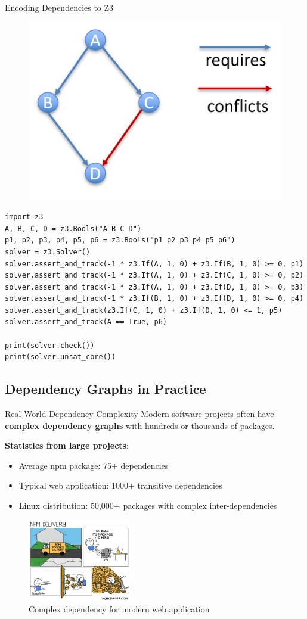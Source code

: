 \documentclass{beamer}
\begin{document}
\begin{frame}[fragile,t]{Encoding Dependencies to Z3}
\begin{figure}
    \includegraphics[width=.3\textwidth]{images/dependency-graph.png}
\end{figure}

\scriptsize
\begin{verbatim}
import z3
A, B, C, D = z3.Bools("A B C D")
p1, p2, p3, p4, p5, p6 = z3.Bools("p1 p2 p3 p4 p5 p6")
solver = z3.Solver()
solver.assert_and_track(-1 * z3.If(A, 1, 0) + z3.If(B, 1, 0) >= 0, p1)
solver.assert_and_track(-1 * z3.If(A, 1, 0) + z3.If(C, 1, 0) >= 0, p2)
solver.assert_and_track(-1 * z3.If(A, 1, 0) + z3.If(D, 1, 0) >= 0, p3)
solver.assert_and_track(-1 * z3.If(B, 1, 0) + z3.If(D, 1, 0) >= 0, p4)
solver.assert_and_track(z3.If(C, 1, 0) + z3.If(D, 1, 0) <= 1, p5)
solver.assert_and_track(A == True, p6)

print(solver.check())
print(solver.unsat_core())

\end{verbatim}
\end{frame}


\subsection{Dependency Graphs in Practice}

\begin{frame}[t]{Real-World Dependency Complexity}
Modern software projects often have \textbf{complex dependency graphs} with hundreds or thousands of packages.

\bigskip

\textbf{Statistics from large projects}:
\begin{itemize}
\item Average npm package: 75+ dependencies
\item Typical web application: 1000+ transitive dependencies
\item Linux distribution: 50,000+ packages with complex inter-dependencies
\end{itemize}

\bigskip

\begin{figure}
\centering
\includegraphics[width=0.4\textwidth]{images/52-npm-delivery.png}
\caption{Complex dependency for modern web application}
\end{figure}
\end{frame}
\end{document}
